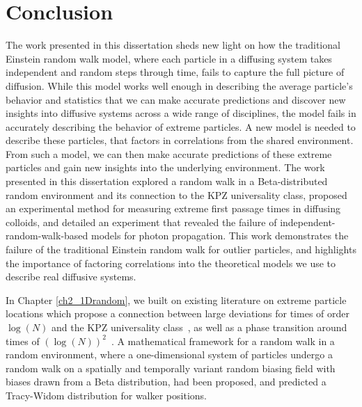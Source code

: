 \chapter{Conclusion}

The work presented in this dissertation sheds new light on how the traditional Einstein random walk model, where each particle in a diffusing system takes independent and random steps through time, fails to capture the full picture of diffusion. While this model works well enough in describing the average particle's behavior and statistics that we can make accurate predictions and discover new insights into diffusive systems across a wide range of disciplines, the model fails in accurately describing the behavior of extreme particles. A new model is needed to describe these particles, that factors in correlations from the shared environment. From such a model, we can then make accurate predictions of these extreme particles and gain new insights into the underlying environment.
The work presented in this dissertation explored a random walk in a Beta-distributed random environment and its connection to the KPZ universality class, proposed an experimental method for measuring extreme first passage times in diffusing colloids, and detailed an experiment that revealed the failure of independent-random-walk-based models for photon propagation. This work demonstrates the failure of the traditional Einstein random walk for outlier particles, and highlights the importance of factoring correlations into the theoretical models we use to describe real diffusive systems.

In Chapter \ref{ch2_1Drandom}, we built on existing literature on extreme particle locations which propose a connection between large deviations for times of order $\log(N)$ and the KPZ universality class~\cite{corwin_kardar_2012,quastel_one-dimensional_2015,kardar_dynamic_1986}, as well as a phase transition around times of $(\log(N))^2$~\cite{le_doussal_diffusion_2017}. A mathematical framework for a random walk in a random environment, where a one-dimensional system of particles undergo a random walk on a spatially and temporally variant random biasing field with biases drawn from a Beta distribution, had been proposed, and predicted a Tracy-Widom distribution for walker positions.

